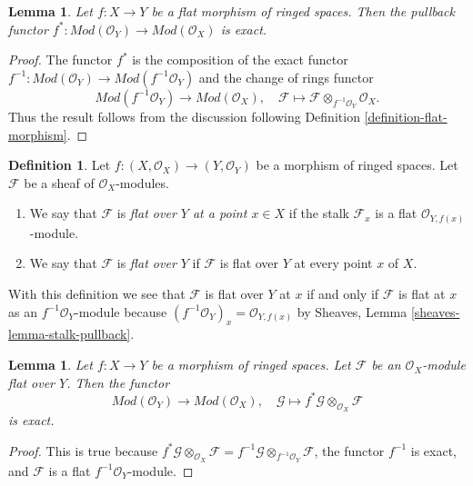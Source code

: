 \documentclass{stacks-project}
\theoremstyle{plain}
\newtheorem{lemma}[subsection]{Lemma}
\theoremstyle{definition}
\newtheorem{definition}[subsection]{Definition}
\theoremstyle{remark}
\numberwithin{equation}{subsection}
\begin{document}
\begin{lemma}
\label{lemma-pullback-flat}
Let $f : X \to Y$ be a flat morphism of ringed spaces.
Then the pullback functor
$f^* : \textit{Mod}(\mathcal{O}_Y) \to \textit{Mod}(\mathcal{O}_X)$
is exact.
\end{lemma}

\begin{proof}
The functor $f^*$ is the composition of the exact functor
$f^{-1} : \textit{Mod}(\mathcal{O}_Y) \to \textit{Mod}(f^{-1}\mathcal{O}_Y)$
and the change of rings functor
$$
\textit{Mod}(f^{-1}\mathcal{O}_Y) \to \textit{Mod}(\mathcal{O}_X), \quad
\mathcal{F} \longmapsto
\mathcal{F} \otimes_{f^{-1}\mathcal{O}_Y} \mathcal{O}_X.
$$
Thus the result follows from the discussion following
Definition \ref{definition-flat-morphism}.
\end{proof}

\begin{definition}
\label{definition-flat-module}
Let $f : (X, \mathcal{O}_X) \to (Y, \mathcal{O}_Y)$ be a morphism of
ringed spaces. Let $\mathcal{F}$ be a sheaf of $\mathcal{O}_X$-modules.
\begin{enumerate}
\item We say that $\mathcal{F}$ is {\it flat over $Y$ at a point $x \in X$}
if the stalk $\mathcal{F}_x$ is a flat $\mathcal{O}_{Y, f(x)}$-module.
\item We say that $\mathcal{F}$ is {\it flat over $Y$} if
$\mathcal{F}$ is flat over $Y$ at every point $x$ of $X$.
\end{enumerate}
\end{definition}

\noindent
With this definition we see that $\mathcal{F}$ is flat over $Y$ at $x$
if and only if $\mathcal{F}$ is flat at $x$ as an
$f^{-1}\mathcal{O}_Y$-module because
$(f^{-1}\mathcal{O}_Y)_x = \mathcal{O}_{Y, f(x)}$ by
Sheaves, Lemma \ref{sheaves-lemma-stalk-pullback}.

\begin{lemma}
\label{lemma-pullback-tensor-flat-module}
Let $f : X \to Y$ be a morphism of ringed spaces. Let $\mathcal{F}$
be an $\mathcal{O}_X$-module flat over $Y$. Then the functor
$$
\textit{Mod}(\mathcal{O}_Y) \to \textit{Mod}(\mathcal{O}_X),\quad
\mathcal{G} \longmapsto f^*\mathcal{G} \otimes_{\mathcal{O}_X} \mathcal{F}
$$
is exact.
\end{lemma}

\begin{proof}
This is true because
$f^*\mathcal{G} \otimes_{\mathcal{O}_X} \mathcal{F} =
f^{-1}\mathcal{G} \otimes_{f^{-1}\mathcal{O}_Y} \mathcal{F}$,
the functor $f^{-1}$ is exact, and $\mathcal{F}$ is a flat
$f^{-1}\mathcal{O}_Y$-module.
\end{proof}
\end{document}
